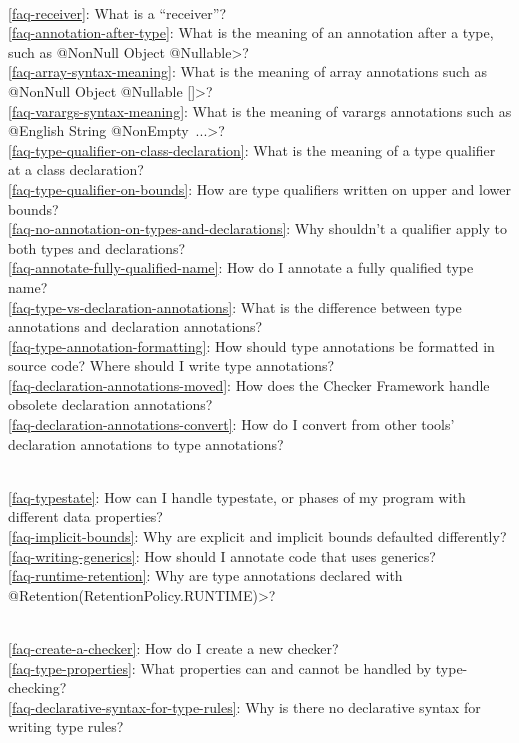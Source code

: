 \\ \ref{faq-receiver}: What is a ``receiver''?
\\ \ref{faq-annotation-after-type}: What is the meaning of an annotation after a type, such as \<@NonNull Object @Nullable>?
\\ \ref{faq-array-syntax-meaning}: What is the meaning of array annotations such as \<@NonNull Object @Nullable []>?
\\ \ref{faq-varargs-syntax-meaning}: What is the meaning of varargs annotations such as \<@English String @NonEmpty~...>?
\\ \ref{faq-type-qualifier-on-class-declaration}: What is the meaning of a type qualifier at a class declaration?
\\ \ref{faq-type-qualifier-on-bounds}: How are type qualifiers written on upper and lower bounds?
\\ \ref{faq-no-annotation-on-types-and-declarations}: Why shouldn't a qualifier apply to both types and declarations?
\\ \ref{faq-annotate-fully-qualified-name}: How do I annotate a
fully qualified type name?
\\ \ref{faq-type-vs-declaration-annotations}: What is the difference between type annotations and declaration annotations?
\\ \ref{faq-type-annotation-formatting}: How should type annotations be formatted in source code?  Where should I write type annotations?
\\ \ref{faq-declaration-annotations-moved}: How does the Checker Framework handle obsolete declaration annotations?
\\ \ref{faq-declaration-annotations-convert}: How do I convert from other tools' declaration annotations to type annotations?

\\ \ref{faq-typestate}: How can I handle typestate, or phases of my program with different data properties?
\\ \ref{faq-implicit-bounds}: Why are explicit and implicit bounds defaulted differently?
\\ \ref{faq-writing-generics}: How should I annotate code that uses generics?
\\ \ref{faq-runtime-retention}: Why are type annotations declared with \<@Retention(RetentionPolicy.RUNTIME)>?

\\ \ref{faq-create-a-checker}: How do I create a new checker?
\\ \ref{faq-type-properties}: What properties can and cannot be handled by type-checking?
\\ \ref{faq-declarative-syntax-for-type-rules}: Why is there no declarative syntax for writing type rules?

